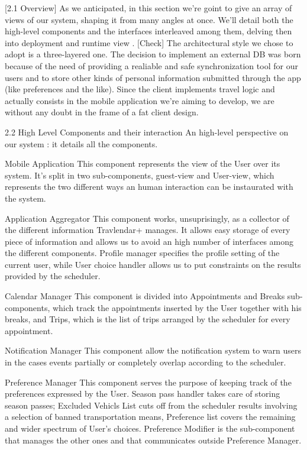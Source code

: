 [2.1 Overview]
As we anticipated, in this section we’re goint to give an array of views of our system, shaping it from many angles at once. We’ll detail both the high-level components and the interfaces interleaved among them, delving then into deployment and runtime view .
[Check] The architectural style we chose to adopt is a three-layered one.
The decision to implement an external DB was born because of the need of providing a realiable and safe synchronization tool for our users and to store other kinds of personal information submitted through the app (like preferences and the like).
Since the client implements travel logic and actually consists in the mobile application we’re aiming to develop, we are without any doubt in the frame of a fat client design.


2.2 High Level Components and their interaction
An high-level perspective on our system : it details all the components.


Mobile Application
This component represents the view of the User over its system. It’s split in two sub-components, guest-view and User-view, which represents the two different ways an human interaction can be instaurated with the system.

Application Aggregator
This component works, unsuprisingly, as a collector of the different information Travlendar+ manages. It allows easy storage of every piece of information and allows us to avoid an high number of interfaces among the different components. Profile manager specifies the profile setting of the current user, while User choice handler allows us to put constraints on the results provided by the scheduler.
 
Calendar Manager
This component is divided into Appointments and Breaks sub-components, which track the appointments inserted by the User together with his breaks, and Trips, which is the list of trips arranged by the scheduler for every appointment.

Notification Manager
This component allow the notification system to warn users in the cases events partially or completely overlap according to the scheduler.

Preference Manager
This component serves the purpose of keeping track of the preferences expressed by the User. Season pass handler takes care of storing season passes; Excluded Vehicls List cuts off from the scheduler results involving a selection of banned transportation means, Preference list covers the remaining and wider spectrum of User's choices.
Preference Modifier is the sub-component that manages the other ones and that communicates outside Preference Manager.

